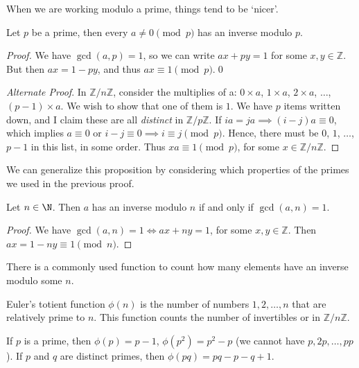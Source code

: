 \documentclass[a4paper]{scrartcl}
\begin{document}
When we are working modulo a prime, things tend to be `nicer'.

\begin{proposition}
	Let $p$ be a prime, then every $a \neq 0 \pmod{p}$ has an inverse modulo $p$.
\end{proposition}
\begin{proof}
	We have $\gcd(a, p) = 1$, so we can write $ax + py = 1$ for some $x,y \in \mathbb{Z}$. But then $ax = 1 - py$, and thus $ax \equiv 1 \pmod{p}$.\hfill\qed

	\emph{Alternate Proof}. 
	In $\mathbb{Z}/n\mathbb{Z}$, consider the multiplies of a: $0\times a$, $1 \times a$, $2 
	\times a$, $\dots$, $(p - 1)\times a$. We wish to show that one of them is $1$. We have $p$ items written down, and I claim these are all \emph{distinct} in $\mathbb{Z}/p\mathbb{Z}$. If $ia = ja \implies (i - j)a \equiv 0$, which implies $a \equiv 0$ or $i -j \equiv 0 \implies i \equiv j \pmod{p}$. Hence, there must be $0$, $1$, $\dots$, $p - 1$ in this list, in some order. Thus $xa \equiv 1 \pmod{p}$, for some $x \in \mathbb{Z}/n\mathbb{Z}$.
\end{proof}

We can generalize this proposition by considering which properties of the primes we used in the previous proof.

\begin{proposition}
	Let $n \in \N$. Then $a$ has an inverse modulo $n$ if and only if $\gcd(a, n) = 1$.
\end{proposition}
\begin{proof}
	We have $\gcd(a, n) = 1 \iff ax + ny = 1$, for some $x, y \in \mathbb{Z}$. Then $ax = 1 - ny \equiv 1 \pmod{n}$.
\end{proof}

There is a commonly used function to count how many elements have an inverse modulo some $n$.

\begin{definition}
	Euler's totient function $\phi(n)$ is the number of numbers $1, 2, \dots, n$ that are relatively prime to $n$.
	This function counts the number of invertibles or  in $\mathbb{Z}/n\mathbb{Z}$.
\end{definition}

\begin{example}
	If $p$ is a prime, then $\phi(p) = p - 1$, $\phi(p^2) = p^2 - p$ (we cannot have $p, 2p, \dots, pp$). If $p$ and $q$ are distinct primes, then $\phi(pq) = pq - p - q + 1$.
\end{example}
\end{document}
